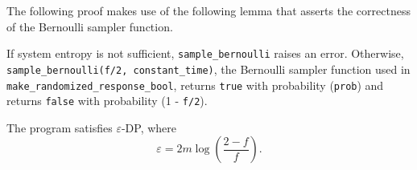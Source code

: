 \documentclass{article}
\begin{document}
\begin{tcolorbox}
\begin{note}
The following proof makes use of the following lemma that asserts the correctness of the Bernoulli sampler function.
    \begin{lemma}
    If system entropy is not sufficient, \texttt{sample\_bernoulli} raises an error.
    Otherwise, \texttt{sample\_bernoulli(f/2, constant\_time)}, the Bernoulli sampler function used in \texttt{make\_randomized\_response\_bool},
    returns \texttt{true} with probability (\texttt{prob}) and returns  \texttt{false} with probability (1 - \texttt{f/2}).
    \end{lemma}
\end{note}
\end{tcolorbox}
\begin{theorem}
\label{thm:privacy-parameter}
	The program  satisfies $\varepsilon$-DP, where
	\begin{equation*}
		\varepsilon = 2m\log\left(\frac{2-f}{f}\right).
	\end{equation*}
\end{theorem}
\end{document}
